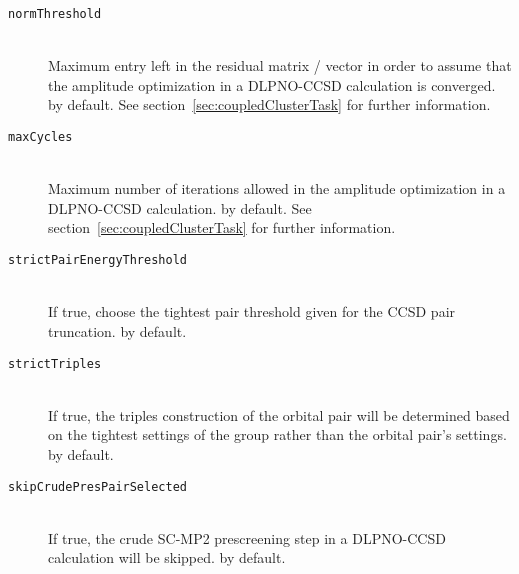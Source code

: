 \begin{description}
\item[\texttt{normThreshold}] \hfill \\
Maximum entry left in the residual matrix / vector in order to assume that the amplitude optimization in a DLPNO-CCSD calculation is converged.  by default. See section~\ref{sec:coupledClusterTask} for further information.
\item[\texttt{maxCycles}] \hfill \\
Maximum number of iterations allowed in the amplitude optimization in a DLPNO-CCSD calculation.  by default. See section~\ref{sec:coupledClusterTask} for further information.
\item[\texttt{strictPairEnergyThreshold}] \hfill \\
If true, choose the tightest pair threshold given for the CCSD pair truncation.  by default.
\item[\texttt{strictTriples}] \hfill \\
If true, the triples construction of the orbital pair will be determined based on the tightest settings of the group rather than the orbital pair's settings.  by default.
\item[\texttt{skipCrudePresPairSelected}] \hfill \\
If true, the crude SC-MP2 prescreening step in a DLPNO-CCSD calculation will be skipped.  by default.  
 
\end{description}
